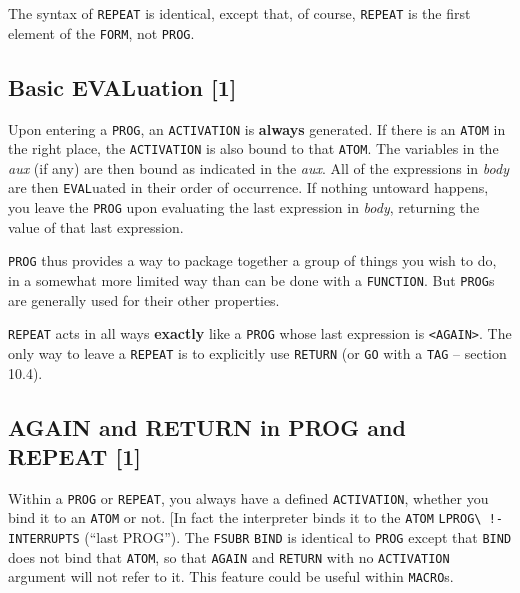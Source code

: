\documentclass[a4paper]{scrbook}
\begin{document}
The syntax of \texttt{REPEAT} is identical, except that, of course, \texttt{REPEAT} is the first element of the
\texttt{FORM}, not \texttt{PROG}.

\subsection{Basic EVALuation {[}1{]}}\label{basic-evaluation-1}

Upon entering a \texttt{PROG}, an \texttt{ACTIVATION} is \textbf{always} generated. If there is an \texttt{ATOM} in the
right place, the \texttt{ACTIVATION} is also bound to that \texttt{ATOM}. The variables in the \emph{aux} (if any) are then
bound as indicated in the \emph{aux}. All of the expressions in \emph{body} are then \texttt{EVAL}uated in their order of
occurrence. If nothing untoward happens, you leave the \texttt{PROG} upon evaluating the last expression in \emph{body},
returning the value of that last expression.

\texttt{PROG} thus provides a way to package together a group of things you wish to do, in a somewhat more limited way than
can be done with a \texttt{FUNCTION}. But \texttt{PROG}s are generally used for their other properties.

\texttt{REPEAT} acts in all ways \textbf{exactly} like a \texttt{PROG} whose last expression is
\texttt{\textless{}AGAIN\textgreater{}}. The only way to leave a \texttt{REPEAT} is to explicitly use \texttt{RETURN} (or
\texttt{GO} with a \texttt{TAG} -- section 10.4).

\subsection{AGAIN and RETURN in PROG and REPEAT {[}1{]}}\label{again-and-return-in-prog-and-repeat-1}

Within a \texttt{PROG} or \texttt{REPEAT}, you always have a defined \texttt{ACTIVATION}, whether you bind it to an
\texttt{ATOM} or not. {[}In fact the interpreter binds it to the \texttt{ATOM} \texttt{LPROG\textbackslash{}\ !-INTERRUPTS}
 (``last PROG''). The \texttt{FSUBR}  \texttt{BIND}
 is identical to \texttt{PROG} except that \texttt{BIND} does not bind that \texttt{ATOM}, so
that \texttt{AGAIN}  and \texttt{RETURN}  with no
\texttt{ACTIVATION} argument will not refer to it. This feature could be useful within \texttt{MACRO}s.
\index{\texttt{MACRO}}{]}
\end{document}

